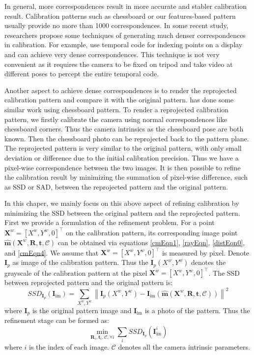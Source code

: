 \documentclass{report}
\begin{document}
In general, more correspondences result in more accurate and stabler calibration result. Calibration patterns such as chessboard or our features-based pattern usually provide no more than 1000 correspondences. In some recent study, researchers propose some techniques of generating much denser correspondences in calibration.  For example, \cite{grosse2012camera, schmalz2011camera} use temporal code for indexing points on a display and can achieve very dense correspondences. This technique is not very convenient as it requires the camera to be fixed on tripod and take video at different poses to percept the entire temporal code. 

Another aspect to achieve dense correspondences is to render the reprojected calibration pattern and compare it with the original pattern. \cite{schiller2008calibration} has done some similar work using chessboard pattern. To render a reprojected calibration pattern, we firstly calibrate the camera using normal correspondences like chessboard corners. Thus the camera intrinsics as the chessboard pose are both known. Then the chessboard photo can be reprojected back to the pattern plane. The reprojected pattern is very similar to the original pattern, with only small deviation or difference due to the initial calibration precision. Thus we have a pixel-wise correspondence between the two images. It is then possible to refine the calibration result by minimizing the summation of pixel-wise difference, such as SSD or SAD, between the reprojected pattern and the original pattern. 

In this chaper, we mainly focus on this above aspect of refining calibration by minimizing the SSD between the original pattern and the reprojected pattern. First we provide a formulation of the refinement problem. For a point $\mathbf{X}^w = [X^w, Y^w, 0]^\top$ on the calibration pattern, its corresponding image point $\hat{\mathbf{m}}(\mathbf{X}^w, \mathbf{R}, \mathbf{t}, \mathcal{C})$ can be obtained via equations \ref{cmEqn1}, \ref{rayEqn}, \ref{distEqn0}, and \ref{cmEqn4}. We assume that $\mathbf{X}^w = [X^w, Y^w, 0]^\top$ is measured by pixel. Denote $\mathbf{I}_p$ as image of the calibration pattern. Thus the $\mathbf{I}_p(X^w, Y^w)$ denotes the grayscale of the calibration pattern at the pixel $\mathbf{X}^w = [X^w, Y^w, 0]^\top$. The SSD between reprojected pattern and the original pattern is: 
\begin{equation}
SSD_{\mathbf{I}_p}(\mathbf{I}_\text{im}) = \sum_{X^w, Y^w} \left\|\mathbf{I}_p(X^w, Y^w) - \mathbf{I}_\text{im}(\hat{\mathbf{m}}(\mathbf{X}^w, \mathbf{R}, \mathbf{t}, \mathcal{C}))\right\|^2
\end{equation}
where $\mathbf{I}_p$ is the original pattern image and $\mathbf{I}_\text{im}$ is a photo of the pattern. Thus the refinement stage can be formed as: 
\begin{equation}
\min_{\mathbf{R}_i, \mathbf{t}_i, \mathcal{C}, \forall i} \sum_{i} SSD_{\mathbf{I}_p}(\mathbf{I}_\text{im}^i)
\label{SSDObjEqn}
\end{equation}
where $i$ is the index of each image. $\mathcal{C}$ denotes all the camera intrinsic parameters. 
\end{document}
